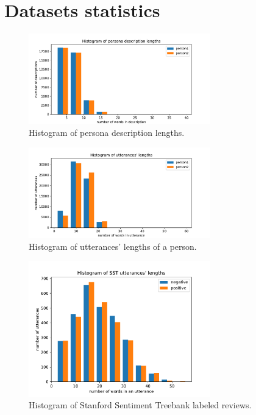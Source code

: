 \chapter{Datasets statistics}

\begin{figure}[hbt]
  \centering
  \includegraphics[width=0.7\textwidth]{figures/persona_desc.pdf}
  \caption{Histogram of persona description lengths.}
  \label{fig:histogram_persona_desc}
\end{figure}

\begin{figure}[hbt]
  \centering
  \includegraphics[width=0.7\textwidth]{figures/uttr_length.pdf}
  \caption{Histogram of utterances' lengths of a person.}
  \label{fig:histogram_uttr_length}
\end{figure}

\begin{figure}
  \centering
  \includegraphics[width=0.7\textwidth]{figures/sst.pdf}
  \caption{Histogram of Stanford Sentiment Treebank labeled reviews.}
  \label{fig:sst}
\end{figure}

